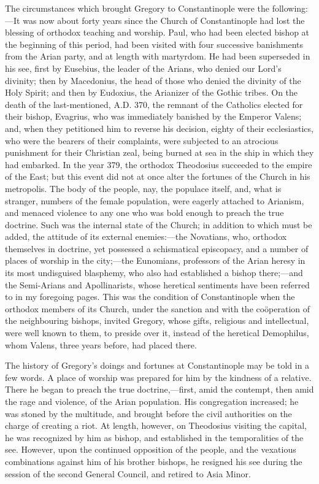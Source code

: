 The circumstances which brought Gregory to Constantinople were the
following:—It was now about forty years since the Church of
Constantinople had lost the blessing of orthodox teaching and worship.
Paul, who had been elected bishop at the beginning of this period, had
been visited with four successive banishments from the Arian party,
and at length with martyrdom. He had been superseded in his see, first
by Eusebius, the leader of the Arians, who denied our Lord's divinity;
then by Macedonius, the head of those who denied the divinity of the
Holy Spirit; and then by Eudoxius, the Arianizer of the Gothic tribes.
On the death of the last-mentioned, A.D. 370,
the remnant of the Catholics elected for their bishop, Evagrius, who
was immediately banished by the Emperor Valens; and, when they
petitioned him to reverse his decision, eighty of their ecclesiastics,
who were the bearers of their complaints, were subjected to an
atrocious punishment for their Christian zeal, being burned at sea in
the ship in which they had embarked. In the year 379, the orthodox
Theodosius succeeded to the empire of the East; but this event did not
at once alter the fortunes of the Church in his metropolis. The body
of the people, nay, the populace itself, and, what is stranger,
numbers of the female population, were eagerly attached to Arianism,
and menaced violence to any one who was bold enough to preach the true
doctrine. Such was the internal state of the Church; in addition to
which must be added, the attitude of its external enemies:—the
Novatians, who, orthodox themselves in doctrine, yet possessed a
schismatical episcopacy, and a number of places of worship in the
city;—the Eunomians, professors of the Arian heresy in its most
undisguised blasphemy, who also had established a bishop there;—and
the Semi-Arians and Apollinarists, whose heretical sentiments have
been referred to in my foregoing pages. This was the condition of
Constantinople when the orthodox members of its Church, under the
sanction and with the coöperation of the neighbouring bishops,
invited Gregory, whose gifts, religious and intellectual, were well
known to them, to preside over it, instead of the heretical Demophilus,
whom Valens, three years before, had placed there.

The history of Gregory's doings and fortunes at Constantinople may
be told in a few words. A place of worship was prepared for him by the
kindness of a relative. There he began to preach the true doctrine,—first,
amid the contempt, then amid the rage and violence, of the Arian
population. His congregation increased; he was stoned by the
multitude, and brought before the civil authorities on the charge of
creating a riot. At length, however, on Theodosius visiting the
capital, he was recognized by him as bishop, and established in the
temporalities of the see. However, upon the continued opposition of
the people, and the vexatious combinations against him of his brother
bishops, he resigned his see during the session of the second General
Council, and retired to Asia Minor.

